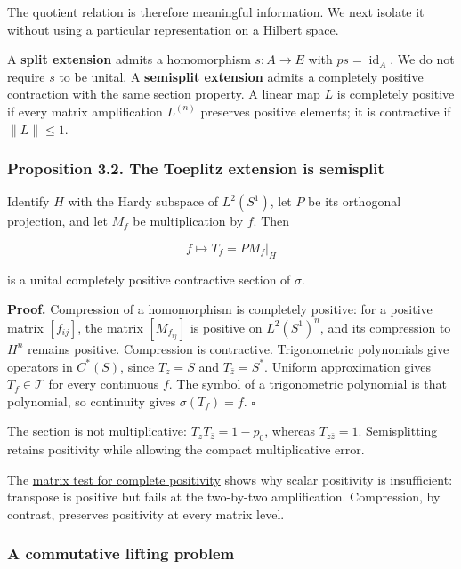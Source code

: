 \documentclass[
  11pt,
]{article}
\begin{document}
The quotient relation is therefore meaningful information. We next
isolate it without using a particular representation on a Hilbert space.

A \textbf{split extension} admits a homomorphism \(s:A\to E\) with
\(ps=\operatorname{id}_A\). We do not require \(s\) to be unital. A
\textbf{semisplit extension} admits a completely positive contraction
with the same section property. A linear map \(L\) is completely
positive if every matrix amplification \(L^{(n)}\) preserves positive
elements; it is contractive if \(\|L\|\leq1\).

\subsubsection{Proposition 3.2. The Toeplitz extension is
semisplit}\label{proposition-3.2.-the-toeplitz-extension-is-semisplit}

Identify \(H\) with the Hardy subspace of \(L^2(S^1)\), let \(P\) be its
orthogonal projection, and let \(M_f\) be multiplication by \(f\). Then

\[
f\longmapsto T_f=PM_f|_H
\]

is a unital completely positive contractive section of \(\sigma\).

\textbf{Proof.} Compression of a homomorphism is completely positive:
for a positive matrix \([f_{ij}]\), the matrix \([M_{f_{ij}}]\) is
positive on \(L^2(S^1)^n\), and its compression to \(H^n\) remains
positive. Compression is contractive. Trigonometric polynomials give
operators in \(C^*(S)\), since \(T_z=S\) and \(T_{\bar z}=S^*\). Uniform
approximation gives \(T_f\in\mathcal T\) for every continuous \(f\). The
symbol of a trigonometric polynomial is that polynomial, so continuity
gives \(\sigma(T_f)=f\). \(\square\)

The section is not multiplicative: \(T_zT_{\bar z}=1-p_0\), whereas
\(T_{z\bar z}=1\). Semisplitting retains positivity while allowing the
compact multiplicative error.

The \href{erdman-positive-maps.html}{matrix test for complete
positivity} shows why scalar positivity is insufficient: transpose is
positive but fails at the two-by-two amplification. Compression, by
contrast, preserves positivity at every matrix level.

\subsubsection{A commutative lifting
problem}\label{a-commutative-lifting-problem}
\end{document}
